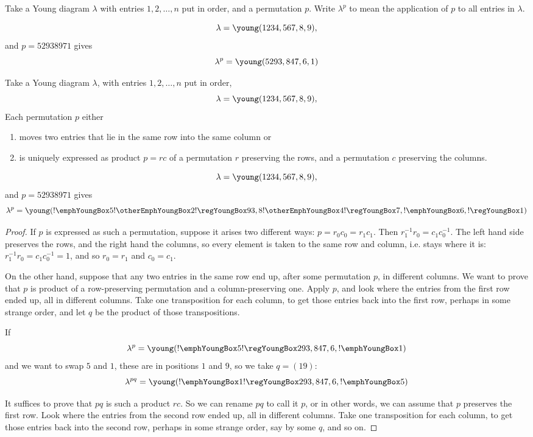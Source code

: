 Take a Young diagram \(\lambda\) with entries \(1,2,\dots,n\) put in order, and a permutation \(p\).
Write \(\lambda^p\) to mean the application of \(p\) to all entries in \(\lambda\).
\begin{example}
\[
\lambda=\young(1234,567,8,9),
\]
and \(p=52938971\) gives
\[
\lambda^p=\young(5293,847,6,1)
\]
\end{example}
\begin{lemma}\label{lemma:moves.two}
Take a Young diagram \(\lambda\), with entries \(1,2,\dots,n\) put in order, 
\[
\lambda=\young(1234,567,8,9),
\]
Each permutation \(p\) either 
\begin{enumerate}
\item
moves two entries that lie in the same row into the same column or
\item
is uniquely expressed as product \(p=rc\) of a permutation \(r\) preserving the rows, and a permutation \(c\) preserving the columns.
\end{enumerate}
\end{lemma}
\begin{example}
\[
\lambda=\young(1234,567,8,9),
\]
and \(p=52938971\) gives
\[
\lambda^p=\young(!\emphYoungBox5!\otherEmphYoungBox2!\regYoungBox93,8!\otherEmphYoungBox4!\regYoungBox7,!\emphYoungBox6,!\regYoungBox1)
\]
\end{example}
\begin{proof}
If \(p\) is expressed as such a permutation, suppose it arises two different ways: \(p=r_0c_0=r_1c_1\).
Then \(r_1^{-1}r_0=c_1c_0^{-1}\).
The left hand side preserves the rows, and the right hand the columns, so every element is taken to the same row and column, i.e. stays where it is: \(r_1^{-1}r_0=c_1c_0^{-1}=1\), and so \(r_0=r_1\) and \(c_0=c_1\).

On the other hand, suppose that any two entries in the same row end up, after some permutation \(p\), in different columns.
We want to prove that \(p\) is product of a row-preserving permutation and a column-preserving one.
Apply \(p\), and look where the entries from the first row ended up, all in different columns.
Take one transposition for each column, to get those entries back into the first row, perhaps in some strange order, and let \(q\) be the product of those transpositions.
\begin{example}
If
\[
\lambda^p=\young(!\emphYoungBox5!\regYoungBox293,847,6,!\emphYoungBox1)
\]
and we want to swap \(5\) and \(1\), these are in positions \(1\) and \(9\), so we take \(q=(19)\):
\[
\lambda^{pq}=\young(!\emphYoungBox1!\regYoungBox293,847,6,!\emphYoungBox5)
\]
\end{example}
It suffices to prove that  \(pq\) is such a product \(rc\).
So we can rename \(pq\) to call it \(p\), or in other words, we can assume that \(p\) preserves the first row.
Look where the entries from the second row ended up, all in different columns.
Take one transposition for each column, to get those entries back into the second row, perhaps in some strange order, say by some \(q\), and so on.
\end{proof}


